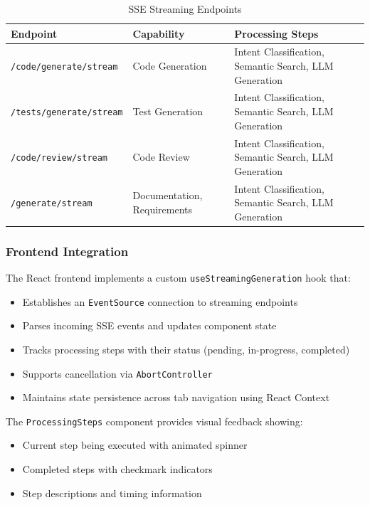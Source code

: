 \documentclass[12pt,a4paper]{article}
\begin{document}
\begin{table}[H]
\centering
\caption{SSE Streaming Endpoints}
\begin{tabular}{llp{6cm}}
\toprule
\textbf{Endpoint} & \textbf{Capability} & \textbf{Processing Steps} \\
\midrule
\texttt{/code/generate/stream} & Code Generation & Intent Classification, Semantic Search, LLM Generation \\
\texttt{/tests/generate/stream} & Test Generation & Intent Classification, Semantic Search, LLM Generation \\
\texttt{/code/review/stream} & Code Review & Intent Classification, Semantic Search, LLM Generation \\
\texttt{/generate/stream} & Documentation, Requirements & Intent Classification, Semantic Search, LLM Generation \\
\bottomrule
\end{tabular}
\label{tab:sse_endpoints}
\end{table}

\subsubsection{Frontend Integration}

The React frontend implements a custom \texttt{useStreamingGeneration} hook that:
\begin{itemize}
    \item Establishes an \texttt{EventSource} connection to streaming endpoints
    \item Parses incoming SSE events and updates component state
    \item Tracks processing steps with their status (pending, in-progress, completed)
    \item Supports cancellation via \texttt{AbortController}
    \item Maintains state persistence across tab navigation using React Context
\end{itemize}

The \texttt{ProcessingSteps} component provides visual feedback showing:
\begin{itemize}
    \item Current step being executed with animated spinner
    \item Completed steps with checkmark indicators
    \item Step descriptions and timing information
\end{itemize}
\end{document}
